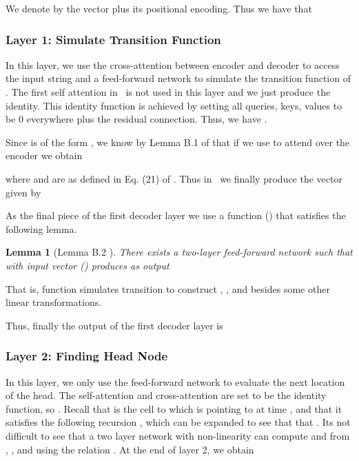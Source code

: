 \documentclass{article}
\newtheorem{lemma}{Lemma}
\begin{document}
We denote by  the vector  plus its positional encoding.
Thus we have  that


\subsubsection{Layer 1: Simulate Transition Function}


In this layer, we use the cross-attention between encoder and decoder to access the 
input string and  a feed-forward network to simulate the transition function of .
The first self attention in~ is not used in this layer and 
we just produce the identity.
This identity function is achieved by setting all queries, keys, values to be 0 
everywhere plus the residual connection.
Thus, we have  .


Since  is of the form , we know
by Lemma B.1 of \citet{Perez19} that if we use  to attend over the encoder we obtain

where  and  are as defined in Eq. (21) of \citep{Perez19}.
Thus in~ we finally produce the vector  given by



As the final piece of the first decoder layer 
we use a function  () that satisfies the following lemma.
\begin{lemma}[Lemma B.2 \citep{Perez19}]\label{lem:M}
There exists a two-layer feed-forward network  such that with input vector  () produces as output

\end{lemma}
That is, function  simulates transition  
to construct , , and 
besides some other linear transformations.

Thus, finally the output of the first decoder layer is



\subsubsection{Layer 2: Finding Head Node}
In this layer, we only use the feed-forward network to evaluate the next location of the head.
The self-attention and cross-attention are set to be the identity function, so .
Recall that  is the cell to which  is pointing to at time , and that it satisfies the following recursion , which can be expanded to see that
that .
Its not difficult to see that a two layer network with non-linearity can compute  and  from , , and  using the relation .
At the  end of layer 2, we obtain 
\end{document}
